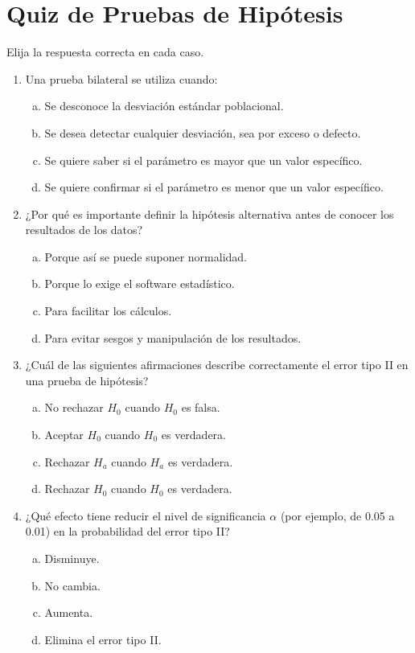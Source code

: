 \documentclass[a4paper]{article}
\begin{document}
\section{Quiz de Pruebas de Hipótesis}

Elija la respuesta correcta en cada caso.

\begin{enumerate}

\item Una prueba bilateral se utiliza cuando:
\begin{enumerate}[a)]
    \item Se desconoce la desviación estándar poblacional.
    \item Se desea detectar cualquier desviación, sea por exceso o defecto.
    \item Se quiere saber si el parámetro es mayor que un valor específico.
    \item Se quiere confirmar si el parámetro es menor que un valor específico.
\end{enumerate}

\item ¿Por qué es importante definir la hipótesis alternativa antes de conocer los resultados de los datos?
\begin{enumerate}[a)]
    \item Porque así se puede suponer normalidad.
    \item Porque lo exige el software estadístico.
    \item Para facilitar los cálculos.
    \item Para evitar sesgos y manipulación de los resultados.
\end{enumerate}

\item ¿Cuál de las siguientes afirmaciones describe correctamente el error tipo II en una prueba de hipótesis?
\begin{enumerate}[a)]
    \item No rechazar $H_0$ cuando $H_0$ es falsa.
    \item Aceptar $H_0$ cuando $H_0$ es verdadera.
    \item Rechazar $H_a$ cuando $H_a$ es verdadera.
    \item Rechazar $H_0$ cuando $H_0$ es verdadera.
\end{enumerate}

\item ¿Qué efecto tiene reducir el nivel de significancia $\alpha$ (por ejemplo, de 0.05 a 0.01) en la probabilidad del error tipo II?
\begin{enumerate}[a)]
    \item Disminuye.
    \item No cambia.
    \item Aumenta.
    \item Elimina el error tipo II.
\end{enumerate}


\end{enumerate}
\end{document}
